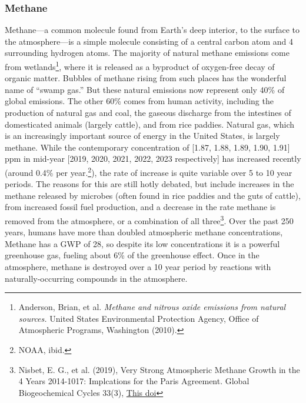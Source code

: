 \subsubsection{Methane}
Methane---a common molecule found from Earth's deep interior, to the surface to the atmosphere---is a simple molecule consisting of a central carbon atom and 4 surrounding hydrogen atoms. The majority of natural methane emissions come from wetlands\footnote{Anderson, Brian, et al. \textit{Methane and nitrous oxide emissions from natural sources.} United States Environmental Protection Agency, Office of Atmospheric Programs, Washington (2010).}, where it is released as a byproduct of oxygen-free decay of organic matter. Bubbles of methane rising from such places has the wonderful name of ``swamp gas.'' But these natural emissions now represent only 40\% of global emissions. The other 60\% comes from human activity, including the production of natural gas and coal, the gaseous discharge from the intestines of domesticated animals (largely cattle), and from rice paddies. Natural gas, which is an increasingly important source of energy in the United States, is largely methane. While the contemporary concentration of [1.87, 1.88, 1.89, 1.90, 1.91] ppm in mid-year [2019, 2020, 2021, 2022, 2023 respectively] has increased recently (around 0.4\% per year.\footnote{NOAA, ibid.}), the rate of increase is quite variable over 5 to 10 year periods. The reasons for this are still hotly debated, but include increases  in the methane released by microbes (often found in rice paddies and the guts of cattle), from increased fossil fuel production, and a decrease in the rate methane is removed from the atmosphere, or a combination of all three\footnote{Nisbet, E. G., et al. (2019), Very Strong Atmospheric Methane Growth in the 4 Years 2014-1017: Implcations for the Paris Agreement. Global Biogeochemical Cycles 33(3), \href{http://doi.org/10.1029/2018GB006009}{This doi}}. Over the past 250 years, humans have more than doubled atmospheric methane concentrations, Methane has a GWP of 28, so despite its low concentrations it is a powerful greenhouse gas, fueling about 6\% of the greenhouse effect. Once in the atmosphere, methane is destroyed over a 10 year period by reactions with naturally-occurring compounds in the atmosphere. \\
